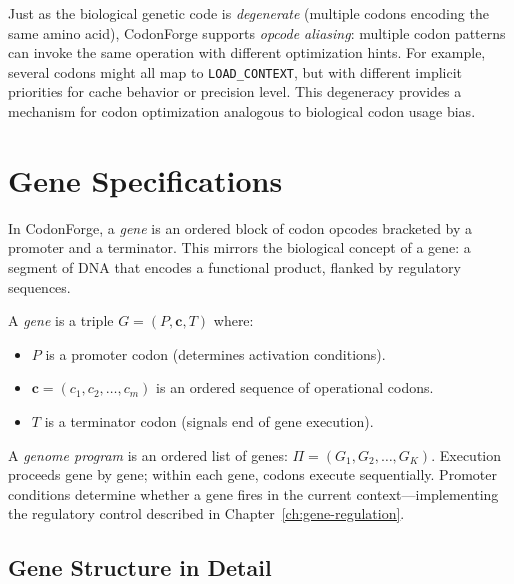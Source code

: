 \begin{bioinsight}
Just as the biological genetic code is \emph{degenerate} (multiple codons encoding the same amino acid), CodonForge supports \emph{opcode aliasing}: multiple codon patterns can invoke the same operation with different optimization hints. For example, several codons might all map to \texttt{LOAD\_CONTEXT}, but with different implicit priorities for cache behavior or precision level. This degeneracy provides a mechanism for codon optimization analogous to biological codon usage bias.
\end{bioinsight}


\section{Gene Specifications}
\label{sec:gene-specs}

In CodonForge, a \emph{gene} is an ordered block of codon opcodes bracketed by a promoter and a terminator. This mirrors the biological concept of a gene: a segment of DNA that encodes a functional product, flanked by regulatory sequences.

\begin{definition}
\label{def:codonforge-gene}
A \emph{gene} is a triple $G = (P, \mathbf{c}, T)$ where:
\begin{itemize}[leftmargin=1.5em]
  \item $P$ is a promoter codon (determines activation conditions).
  \item $\mathbf{c} = (c_1, c_2, \ldots, c_m)$ is an ordered sequence of operational codons.
  \item $T$ is a terminator codon (signals end of gene execution).
\end{itemize}
\end{definition}

A \emph{genome program} is an ordered list of genes: $\Pi = (G_1, G_2, \ldots, G_K)$. Execution proceeds gene by gene; within each gene, codons execute sequentially. Promoter conditions determine whether a gene fires in the current context---implementing the regulatory control described in Chapter~\ref{ch:gene-regulation}.

\subsection{Gene Structure in Detail}

